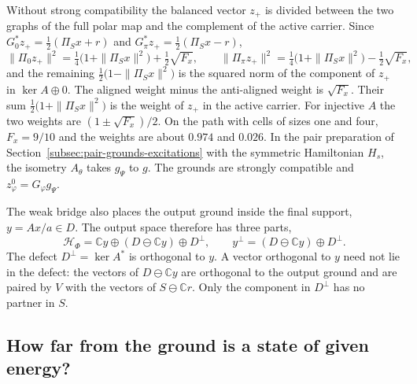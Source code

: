 \documentclass[11pt]{article}
\theoremstyle{definition}
\newcommand{\C}{\mathbb C}
\begin{document}
Without strong compatibility the balanced vector $z_+$ is divided between the two graphs of the full polar map and the complement of the active carrier. Since $G_0^*z_+=\tfrac12(\Pi_Sx+r)$ and $G_\pi^*z_+=\tfrac12(\Pi_Sx-r)$,
\begin{equation}
 \|\Pi_0z_+\|^2=\tfrac14\bigl(1+\|\Pi_Sx\|^2\bigr)+\tfrac12\sqrt{F_x},\qquad
 \|\Pi_\pi z_+\|^2=\tfrac14\bigl(1+\|\Pi_Sx\|^2\bigr)-\tfrac12\sqrt{F_x},
 \label{eq:ground-plane-graph-weights}
\end{equation}
and the remaining $\tfrac12\bigl(1-\|\Pi_Sx\|^2\bigr)$ is the squared norm of the component of $z_+$ in $\ker A\oplus0$. The aligned weight minus the anti-aligned weight is $\sqrt{F_x}$. Their sum $\tfrac12\bigl(1+\|\Pi_Sx\|^2\bigr)$ is the weight of $z_+$ in the active carrier. For injective $A$ the two weights are $(1\pm\sqrt{F_x})/2$. On the path with cells of sizes one and four, $F_x=9/10$ and the weights are about $0.974$ and $0.026$. In the pair preparation of Section~\ref{subsec:pair-grounds-excitations} with the symmetric Hamiltonian $H_s$, the isometry $A_\theta$ takes $g_\Psi$ to $g$. The grounds are strongly compatible and $z^0_\varphi=G_\varphi g_\Psi$.

The weak bridge also places the output ground inside the final support, $y=Ax/a\in D$. The output space therefore has three parts,
\begin{equation}
 \mathcal H_\Phi=\C y\oplus(D\ominus\C y)\oplus D^\perp,\qquad
 y^\perp=(D\ominus\C y)\oplus D^\perp .
 \label{eq:ground-plane-three-parts}
\end{equation}
The defect $D^\perp=\ker A^*$ is orthogonal to $y$. A vector orthogonal to $y$ need not lie in the defect: the vectors of $D\ominus\C y$ are orthogonal to the output ground and are paired by $V$ with the vectors of $S\ominus\C r$. Only the component in $D^\perp$ has no partner in $S$.

\subsection{How far from the ground is a state of given energy?}
\label{subsec:fidelity-energy}
\end{document}
